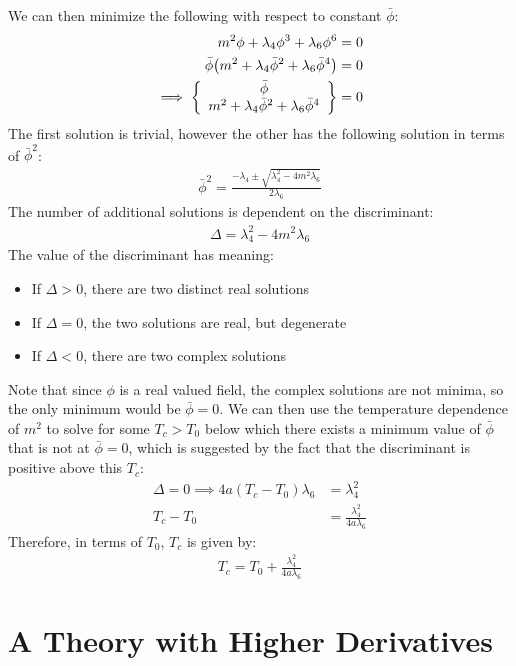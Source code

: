 \documentclass[12pt]{article}
\begin{document}
We can then minimize the following with respect to constant $\bar\phi$:
\begin{align*}
  m^2\phi+\lambda_4\phi^3+\lambda_6\phi^6&=0\\
  \bar\phi\qty(m^2+\lambda_4\bar\phi^2+\lambda_6\bar\phi^4)&=0\\
  \implies\left\{
  \begin{array}[H]{c}
    \bar\phi\\
    m^2+\lambda_4\bar\phi^2+\lambda_6\bar\phi^4  
  \end{array}\right\}
  &=0
\end{align*}
The first solution is trivial, however the other has the following solution in terms of $\bar\phi^2$:
\begin{align*}
  \bar\phi^2=\frac{-\lambda_4\pm\sqrt{\lambda_4^2-4m^2\lambda_6}}{2\lambda_6}
\end{align*}
The number of additional solutions is dependent on the discriminant:
\begin{align*}
  \Delta=\lambda_4^2-4m^2\lambda_6
\end{align*}
The value of the discriminant has meaning:
\begin{itemize}
\item If $\Delta>0$, there are two distinct real solutions
\item If $\Delta=0$, the two solutions are real, but degenerate
\item If $\Delta<0$, there are two complex solutions
\end{itemize}
Note that since $\phi$ is a real valued field, the complex solutions are not minima, so the only minimum would be $\bar\phi=0$. We can then use the temperature dependence of $m^2$ to solve for some $T_c>T_0$ below which there exists a minimum value of $\bar\phi$ that is not at $\bar\phi=0$, which is suggested by the fact that the discriminant is positive above this $T_c$:
\begin{align*}
  \Delta=0\implies4a(T_c-T_0)\lambda_6&=\lambda_4^2\\
  T_c-T_0&=\frac{\lambda_4^2}{4a\lambda_6}
\end{align*}
Therefore, in terms of $T_0$, $T_c$ is given by:
\begin{align}
  \boxed{T_c=T_0+\frac{\lambda_4^2}{4a\lambda_6}}
\end{align}
\section{A Theory with Higher Derivatives}
\end{document}
